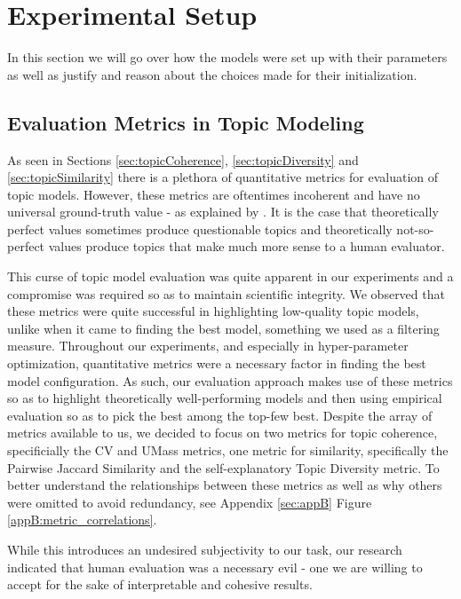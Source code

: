 \section{Experimental Setup}
\label{sec:ExpSetup}

In this section we will go over how the models were set up with their parameters as well as justify and reason about the choices made for their initialization.

\subsection{Evaluation Metrics in Topic Modeling}
\label{sec:eval_metrics}
As seen in Sections \ref{sec:topicCoherence}, \ref{sec:topicDiversity} and \ref{sec:topicSimilarity} there is a plethora of quantitative metrics for evaluation of topic models. However, these metrics are oftentimes incoherent and have no universal ground-truth value - as explained by \cite{Hoyle;Goel;Hian-Cheong;Peskov;Boyd-Graber;Resnik:21}. It is the case that theoretically perfect values sometimes produce questionable topics and theoretically not-so-perfect values produce topics that make much more sense to a human evaluator.

This curse of topic model evaluation was quite apparent in our experiments and a compromise was required so as to maintain scientific integrity. We observed that these metrics were quite successful in highlighting low-quality topic models, unlike when it came to finding the best model, something we used as a filtering measure. Throughout our experiments, and especially in hyper-parameter optimization, quantitative metrics were a necessary factor in finding the best model configuration. As such, our evaluation approach makes use of these metrics so as to highlight theoretically well-performing models and then using empirical evaluation so as to pick the best among the top-few best. Despite the array of metrics available to us, we decided to focus on two metrics for topic coherence, specificially the CV and UMass metrics, one metric for similarity, specifically the Pairwise Jaccard Similarity and the self-explanatory Topic Diversity metric. To better understand the relationships between these metrics as well as why others were omitted to avoid redundancy, see Appendix \ref{sec:appB} Figure \ref{appB:metric_correlations}.

While this introduces an undesired subjectivity to our task, our research indicated that human evaluation was a necessary evil - one we are willing to accept for the sake of interpretable and cohesive results.

